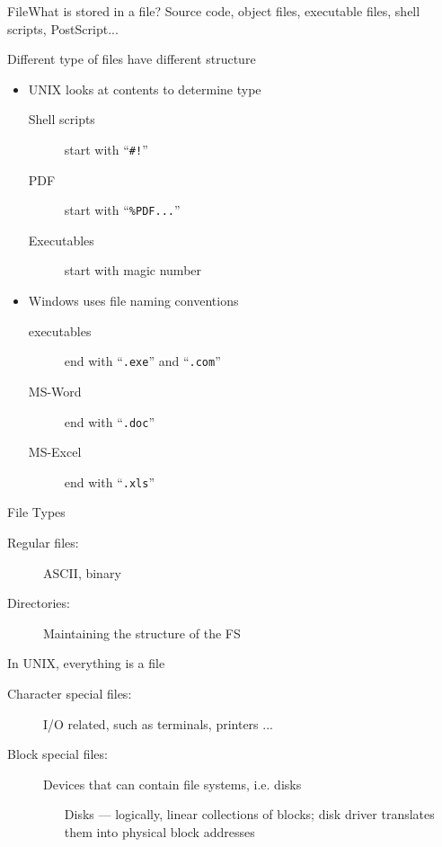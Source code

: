 \begin{frame}{File}{What is stored in a file?}
  Source code, object files, executable files, shell scripts, PostScript...
  \begin{block}{Different type of files have different structure}
    \begin{itemize}
    \item UNIX looks at contents to determine type
      \begin{description}
      \item[Shell scripts] start with ``\texttt{\#!}''
      \item[PDF] start with ``\texttt{\%PDF...}''
      \item[Executables] start with \alert{magic number}
      \end{description}
    \item Windows uses file naming conventions
      \begin{description}
      \item[executables] end with ``\texttt{.exe}'' and ``\texttt{.com}''
      \item[MS-Word] end with ``\texttt{.doc}''
      \item[MS-Excel] end with ``\texttt{.xls}''
      \end{description}
    \end{itemize}
  \end{block}
\end{frame}

\begin{frame}{File Types}
  \begin{description}
  \item[Regular files:] ASCII, binary
  \item[Directories:] Maintaining the structure of the FS
  \end{description}
  \begin{block}{In UNIX, everything is a file}
    \begin{description}
    \item[Character special files:] I/O related, such as terminals, printers ...
    \item[Block special files:] Devices that can contain file systems, i.e. disks
      \begin{itemize}
      \item[Disks] --- logically, linear collections of blocks; disk driver translates
        them into physical block addresses
      \end{itemize}
    \end{description}
  \end{block}
\end{frame}

